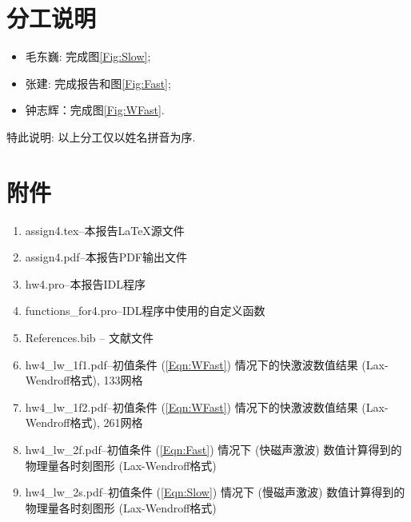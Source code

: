 \documentclass[10.5pt
]{article}
\begin{document}
\section*{分工说明}

\begin{itemize}
	\item 毛东巍: 完成图\ref{Fig:Slow};
	\item 张建: 完成报告和图\ref{Fig:Fast};
	\item 钟志辉：完成图\ref{Fig:WFast}.
\end{itemize}
特此说明: 以上分工仅以姓名拼音为序.
\section{附件}
\begin{enumerate}
\item
assign4.tex--本报告\LaTeX 源文件
\item
assign4.pdf--本报告PDF输出文件
\item
hw4.pro--本报告IDL程序
\item 
functions\_for4.pro--IDL程序中使用的自定义函数
\item
References.bib -- 文献文件
\item
hw4\_lw\_1f1.pdf--初值条件 (\ref{Eqn:WFast}) 情况下的快激波数值结果 (Lax-Wendroff格式), 133网格
\item
hw4\_lw\_1f2.pdf--初值条件 (\ref{Eqn:WFast}) 情况下的快激波数值结果 (Lax-Wendroff格式), 261网格
\item
hw4\_lw\_2f.pdf--初值条件 (\ref{Eqn:Fast}) 情况下 (快磁声激波) 数值计算得到的物理量各时刻图形 (Lax-Wendroff格式)
\item
hw4\_lw\_2s.pdf--初值条件 (\ref{Eqn:Slow}) 情况下 (慢磁声激波) 数值计算得到的物理量各时刻图形 (Lax-Wendroff格式)
\end{enumerate}



\end{document}
